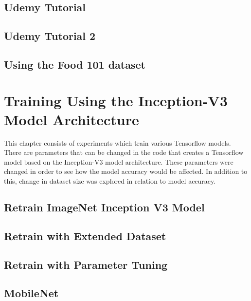 \section{Udemy Tutorial}
\label{udemy1}


\section{Udemy Tutorial 2}
\label{udemy2}


\section{Using the Food 101 dataset}
\label{food101}


\chapter{Training Using the Inception-V3 Model Architecture}
This chapter consists of experiments which train various Tensorflow models.
There are parameters that can be changed in the code that creates a Tensorflow model based on the Inception-V3 model architecture.
These parameters were changed in order to see how the model accuracy would be affected.
In addition to this, change in dataset size was explored in relation to model accuracy.


\section{Retrain ImageNet Inception V3 Model}
\label{inception}


\section{Retrain with Extended Dataset}
\label{extended}


\section{Retrain with Parameter Tuning}
\label{parameterTuning}


\section{MobileNet}
\label{mobilenet}


